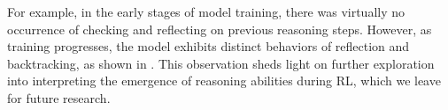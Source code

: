 For example, in the early stages of model training, there was virtually no occurrence of checking and reflecting on previous reasoning steps.
However, as training progresses, the model exhibits distinct behaviors of reflection and backtracking, as shown in . This observation sheds light on further exploration into interpreting the emergence of reasoning abilities during RL, which we leave for future research.



% 

